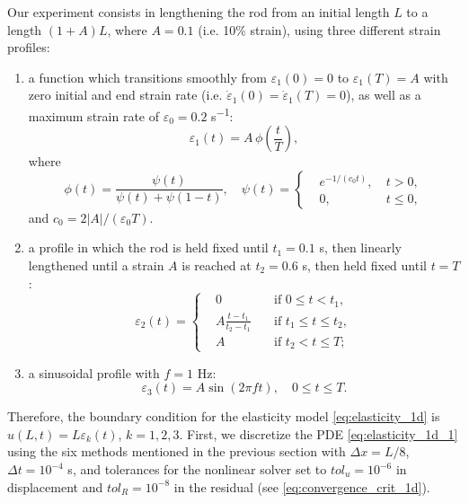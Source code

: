 \documentclass{sfuthesis}
\numberwithin{equation}{section}
\numberwithin{figure}{chapter}
\numberwithin{table}{chapter}
\theoremstyle{definition}
\begin{document}
Our experiment consists in lengthening the rod from an initial length $L$ to a length $(1+A)L$, where $A=0.1$ (i.e. 10\% strain), using three different strain profiles:
\begin{enumerate}
    \item a function which transitions smoothly from $\varepsilon_1(0) = 0$ to $\varepsilon_1(T) = A$ with zero initial and end strain rate (i.e. $\dot{\varepsilon}_1(0) = \dot{\varepsilon}_1(T) = 0$), as well as a maximum strain rate of $\varepsilon_0 = 0.2$ \si{s^{-1}}:
    \begin{equation} \label{eq:smooth_pull}
        \varepsilon_1(t) = A \, \phi\left(\dfrac{t}{T}\right),
    \end{equation}
    where
    \[
        \phi(t) = \dfrac{\psi(t)}{\psi(t) + \psi(1-t)}, \quad \psi(t) = \left\{ \begin{aligned}
        &e^{-1/(c_0 t)}, \ &t > 0, \\
        &0, \ &t \leq 0,
        \end{aligned}\right. 
    \]
    and $c_0 = 2|A|/(\varepsilon_0 T)$.
    \item a profile in which the rod is held fixed until $t_1 = 0.1$ s, then linearly lengthened until a strain $A$ is reached at $t_2 = 0.6$ s, then held fixed until $t = T$:
    \begin{equation} \label{eq:lin_pull}
        \varepsilon_2(t) = \left\{
            \begin{aligned}
                &0 \quad &\text{if } 0 \leq t < t_1, \\
                &A \frac{t-t_1}{t_2-t_1} \quad &\text{if } t_1 \leq t \leq t_2, \\
                &A \quad &\text{if } t_2 < t \leq T;
            \end{aligned}
        \right.
    \end{equation}
    \item a sinusoidal profile with $f = 1$ \si{Hz}:
    \begin{equation} \label{eq:sin_pull}
        \varepsilon_3(t) = A \sin(2\pi f t), \quad 0 \leq t \leq T.
    \end{equation}
\end{enumerate}
Therefore, the boundary condition for the elasticity model \eqref{eq:elasticity_1d} is $u(L,t) = L \varepsilon_k(t)$, $k =1,2,3$. First, we discretize the PDE \eqref{eq:elasticity_1d_1} using the six methods mentioned in the previous section with $\Delta x = L/8$, $\Delta t = 10^{-4}$ s, and tolerances for the nonlinear solver set to $tol_u = 10^{-6}$ in displacement and $tol_R = 10^{-8}$ in the residual (see \eqref{eq:convergence_crit_1d}). 
\end{document}
